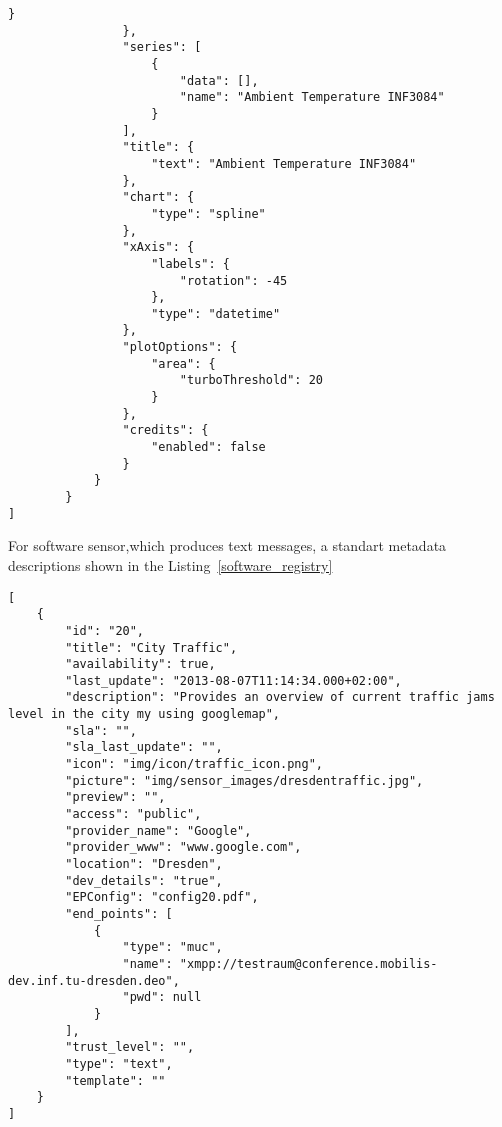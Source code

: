 \begin{lstlisting}[label=hardware_registry,caption=JSON Description Format]
                    }
                },
                "series": [
                    {
                        "data": [],
                        "name": "Ambient Temperature INF3084"
                    }
                ],
                "title": {
                    "text": "Ambient Temperature INF3084"
                },
                "chart": {
                    "type": "spline"
                },
                "xAxis": {
                    "labels": {
                        "rotation": -45
                    },
                    "type": "datetime"
                },
                "plotOptions": {
                    "area": {
                        "turboThreshold": 20
                    }
                },
                "credits": {
                    "enabled": false
                }
            }
        }
]
\end{lstlisting}
For software sensor,which produces text messages, a standart metadata descriptions shown in the Listing~\ref{software_registry}
\begin{lstlisting}[label=software_registry,caption=JSON Description Format for Software Sensor]
[
    {
        "id": "20",
        "title": "City Traffic",
        "availability": true,
        "last_update": "2013-08-07T11:14:34.000+02:00",
        "description": "Provides an overview of current traffic jams level in the city my using googlemap",
        "sla": "",
        "sla_last_update": "",
        "icon": "img/icon/traffic_icon.png",
        "picture": "img/sensor_images/dresdentraffic.jpg",
        "preview": "",
        "access": "public",
        "provider_name": "Google",
        "provider_www": "www.google.com",
        "location": "Dresden",
        "dev_details": "true",
        "EPConfig": "config20.pdf",
        "end_points": [
            {
                "type": "muc",
                "name": "xmpp://testraum@conference.mobilis-dev.inf.tu-dresden.deo",
                "pwd": null
            }
        ],
        "trust_level": "",
        "type": "text",
        "template": ""
    }
]
\end{lstlisting}

